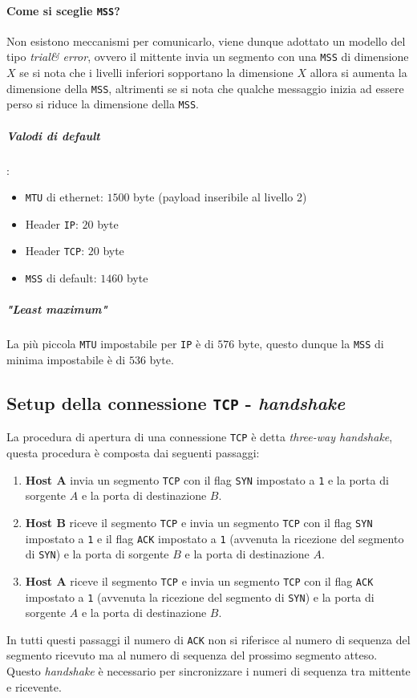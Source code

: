             \paragraph{Come si sceglie \texttt{MSS}?} Non esistono meccanismi per comunicarlo, viene dunque adottato un modello del tipo \textit{trial\& error}, ovvero il mittente invia un segmento con una \texttt{MSS} di dimensione $ X $ se si nota che i livelli inferiori sopportano la dimensione $ X $ allora si aumenta la dimensione della \texttt{MSS}, altrimenti se si nota che qualche messaggio inizia ad essere perso si riduce la dimensione della \texttt{MSS}.
                \subparagraph{Valodi di default}: \begin{itemize}
                    \item \texttt{MTU} di ethernet: $ 1500 $ byte (payload inseribile al livello 2)
                    \item Header \texttt{IP}: $ 20 $ byte
                    \item Header \texttt{TCP}: $ 20 $ byte
                    \item \texttt{MSS} di default: $ 1460 $ byte
                \end{itemize}
                \subparagraph{"\textit{Least maximum}"} La più piccola \texttt{MTU} impostabile per \texttt{IP} è di $ 576 $ byte, questo dunque la \texttt{MSS} di minima impostabile è di $ 536 $ byte.
    \subsection{Setup della connessione \texttt{TCP} - \textit{handshake}}
        La procedura di apertura di una connessione \texttt{TCP} è detta \textit{three-way handshake}, questa procedura è composta dai seguenti passaggi:
        \begin{enumerate}
            \item \textbf{Host A} invia un segmento \texttt{TCP} con il flag \texttt{SYN} impostato a \texttt{1} e la porta di sorgente $ A $ e la porta di destinazione $ B $.
            \item \textbf{Host B} riceve il segmento \texttt{TCP} e invia un segmento \texttt{TCP} con il flag \texttt{SYN} impostato a \texttt{1} e il flag \texttt{ACK} impostato a \texttt{1} (avvenuta la ricezione del segmento di \texttt{SYN}) e la porta di sorgente $ B $ e la porta di destinazione $ A $.
            \item \textbf{Host A} riceve il segmento \texttt{TCP} e invia un segmento \texttt{TCP} con il flag \texttt{ACK} impostato a \texttt{1} (avvenuta la ricezione del segmento di \texttt{SYN}) e la porta di sorgente $ A $ e la porta di destinazione $ B $.
        \end{enumerate}
        In tutti questi passaggi il numero di \texttt{ACK} non si riferisce al numero di sequenza del segmento ricevuto ma al numero di sequenza del prossimo segmento atteso. Questo \textit{handshake} è necessario per sincronizzare i numeri di sequenza tra mittente e ricevente.
